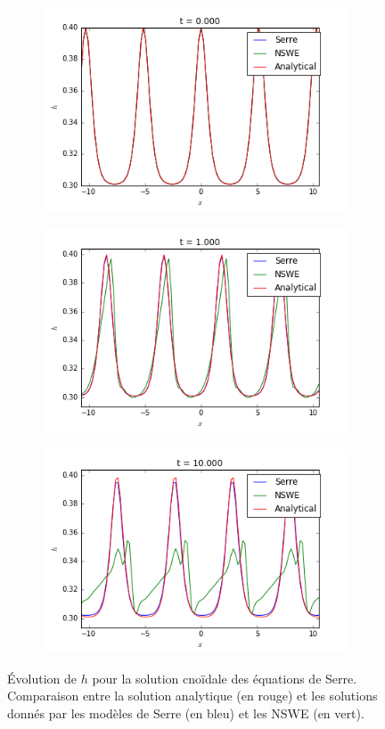 \begin{figure}[h!]
	\begin{subfigure}{.3\linewidth}
		\includegraphics[scale=.3]{figures/Serre/4x4cnoidal1h.png}	
	\end{subfigure}
	\begin{subfigure}{.3\linewidth}
		\includegraphics[scale=.3]{figures/Serre/4x4cnoidal2h.png}	
	\end{subfigure}
	\begin{subfigure}{.3\linewidth}
		\includegraphics[scale=.3]{figures/Serre/4x4cnoidal3h.png}	
	\end{subfigure}
	\caption{Évolution de $h$ pour la solution cnoïdale des équations de Serre. Comparaison entre la solution analytique (en rouge) et les solutions donnés par les modèles de Serre (en bleu) et les NSWE (en vert). \label{fig:cnoidalh}}
\end{figure}

